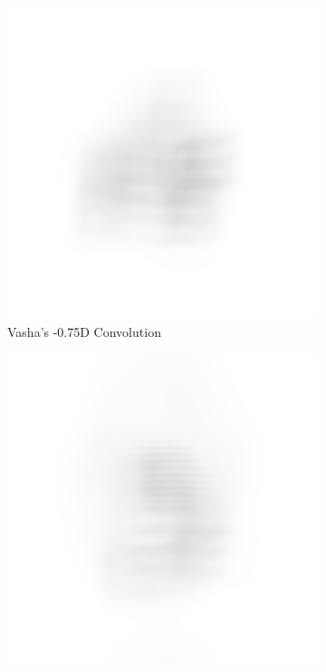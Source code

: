 \documentclass{article}
\begin{document}
\begin{figure}[H]
\begin{subfigure}{.3\textwidth}
  \centering
  \includegraphics[width=1\linewidth]{Vasha_R_G_0530_2_500_zer_-075_5_PSF_convE.png}
  \caption{Vasha's -0.75D Convolution}
  \label{fig:vashan075d}
\end{subfigure}
\begin{subfigure}{.3\textwidth}
  \centering
  \includegraphics[width=1\linewidth]{Liz_R_G_0523_2_500_zer_-075_5_PSF_convE.png}

\end{subfigure}
\end{figure}
\end{document}
